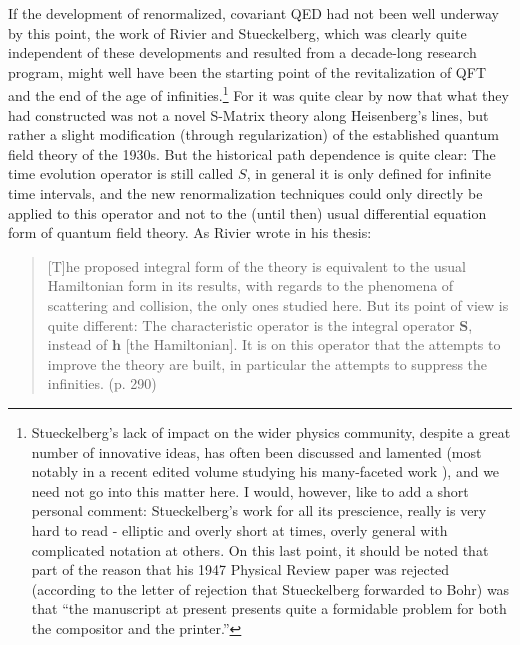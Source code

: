 \documentclass[12pt,a4paper]{article}
\begin{document}
If the development of renormalized, covariant QED had not been well underway by this point, the work of Rivier and Stueckelberg, which was clearly quite independent of these developments and resulted from a decade-long research program, might well have been the starting point of the revitalization of QFT and the end of the age of infinities.\footnote{Stueckelberg's lack of impact on the wider physics community, despite a great number of innovative ideas, has often been discussed and lamented (most notably in a recent edited volume studying his many-faceted work \citep{lacki_2009_ecg}), and we need not go into this matter here. I would, however, like to add a short personal comment: Stueckelberg's work for all its prescience, really is very hard to read - elliptic and overly short at times, overly general with complicated notation at others. On this last point, it should be noted that part of the reason that his 1947 Physical Review paper was rejected (according to the letter of rejection that Stueckelberg forwarded to Bohr) was that ``the manuscript at present presents quite a formidable problem for both the compositor and the printer.''} For it was quite clear by now that what they had constructed was not a novel S-Matrix theory along Heisenberg's lines, but rather a slight modification (through regularization) of the established quantum field theory of the 1930s. But the historical path dependence is quite clear: The time evolution operator is still called $S$, in general it is only defined for infinite time intervals, and the new renormalization techniques could only directly be applied to this operator and not to the (until then) usual differential equation form of quantum field theory. As Rivier wrote in his thesis:

\begin{quote}
[T]he proposed integral form of the theory is equivalent to the usual Hamiltonian form in its results, with regards to the phenomena of scattering and collision, the only ones studied here.
But its point of view is quite different: The characteristic operator is the integral operator $\mathbf{S}$, instead of $\mathbf{h}$ [the Hamiltonian]. It is on this operator that the attempts to improve the theory are built, in particular the attempts to suppress the infinities. (p. 290)
\end{quote}
\end{document}
